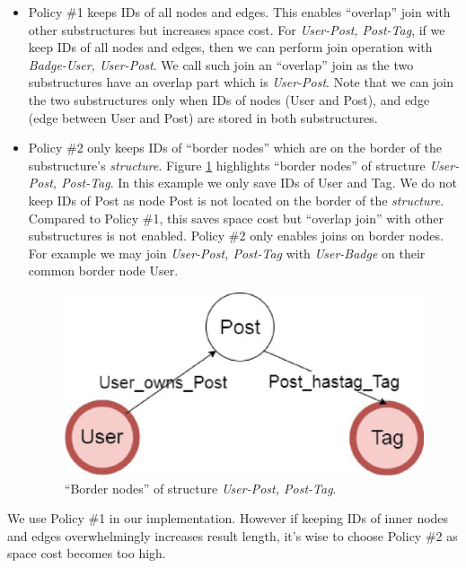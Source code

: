 \begin{itemize}
\item Policy \#1 keeps IDs of all nodes and edges. This enables ``overlap'' join with other substructures but increases space cost. For \textit{User-Post, Post-Tag}, if we keep IDs of all nodes and edges, then we can perform join operation with \textit{Badge-User, User-Post}. We call such join an ``overlap'' join as the two substructures have an overlap part which is \textit{User-Post}. Note that we can join the two substructures only when IDs of nodes (User and Post), and edge (edge between User and Post) are stored in both substructures.

\item Policy \#2 only keeps IDs of ``border nodes'' which are on the border of the substructure's \textit{structure}. Figure \ref{border node} highlights ``border nodes'' of structure \textit{User-Post, Post-Tag}. In this example we only save IDs of User and Tag. We do not keep IDs of Post as node Post is not located on the border of the \textit{structure}. Compared to Policy \#1, this saves space cost but ``overlap join'' with other substructures is not enabled. Policy \#2 only enables joins on border nodes. For example we may join \textit{User-Post, Post-Tag} with \textit{User-Badge} on their common border node User.

\begin{figure}[H]
	\centering
	\includegraphics[scale=0.5]{pic/bordernode.eps}
	\caption{``Border nodes'' of structure \textit{User-Post, Post-Tag}.}
	\label{border node}
\end{figure}
\end{itemize}


We use Policy \#1 in our implementation. However if keeping IDs of inner nodes and edges overwhelmingly increases result length, it's wise to choose Policy \#2 as space cost becomes too high.

